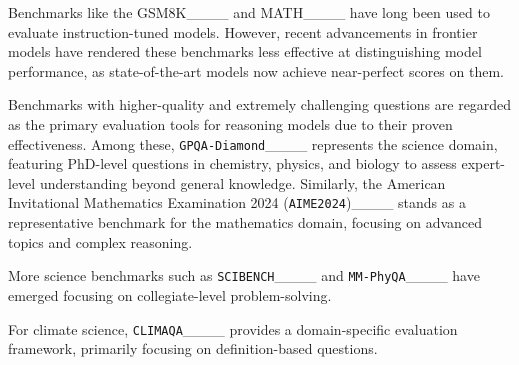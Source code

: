 \iffalse
{
Benchmarks like the GSM8K____ and MATH____ have long been used to evaluate instruction-tuned models. However, recent advancements in frontier models have rendered these benchmarks less effective at distinguishing model performance, as state-of-the-art models now achieve near-perfect scores on them. 

Benchmarks with higher-quality and extremely challenging questions are regarded as the primary evaluation tools for reasoning models due to their proven effectiveness. Among these, \texttt{GPQA-Diamond}____ represents the science domain, featuring PhD-level questions in chemistry, physics, and biology to assess expert-level understanding beyond general knowledge. Similarly, the American Invitational Mathematics Examination 2024 (\texttt{AIME2024})____ stands as a representative benchmark for the mathematics domain, focusing on advanced topics and complex reasoning.

More science benchmarks such as \texttt{SCIBENCH}____ and \texttt{MM-PhyQA}____ have emerged focusing on collegiate-level problem-solving.

For climate science, \texttt{CLIMAQA}____ provides a domain-specific evaluation framework, primarily focusing on definition-based questions.


}
